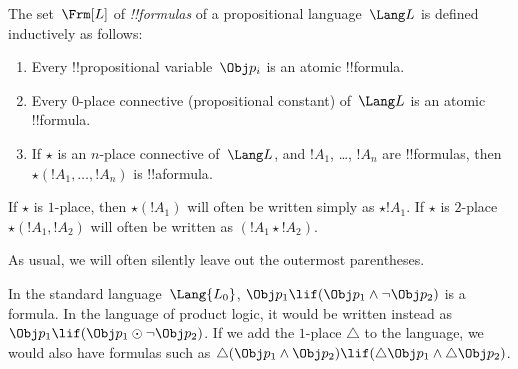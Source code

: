 \documentclass[../../../include/open-logic-section]{subfiles}
\begin{document}


\begin{defn}[Formula]
The set~$\Frm[L]$ of \emph{!!{formula}s} of a propositional
language~$\Lang L$ is defined inductively as follows:
\begin{enumerate}
\item Every !!{propositional variable}~$\Obj p_i$ is an atomic
  !!{formula}.
\item Every $0$-place connective (propositional constant) of~$\Lang L$
is an atomic !!{formula}.
\item If $\star$ is an $n$-place connective of~$\Lang L$, and $!A_1$,
\dots, $!A_n$ are !!{formula}s, then $\star(!A_1, \dots, !A_n)$ is
  !!a{formula}.
\end{enumerate}
If $\star$ is $1$-place, then $\star(!A_1)$ will often be written
simply as $\star !A_1$. If $\star$ is $2$-place $\star(!A_1,!A_2)$
will often be written as $(!A_1 \star !A_2)$. 
\end{defn}

As usual, we will often silently leave out the outermost parentheses.

\begin{ex}
  In the standard language~$\Lang{L_0}$, $\Obj p_1 \lif (\Obj p_1
  \land \lnot \Obj p_2)$ is a formula. In the language of product
  logic, it would be written instead as $\Obj p_1 \lif (\Obj p_1 \odot
  \lnot \Obj p_2)$.  If we add the $1$-place $\triangle$ to the
  language, we would also have formulas such as $\triangle (\Obj p_1
  \land \Obj p_2) \lif (\triangle \Obj p_1 \land \triangle \Obj p_2)$.
\end{ex}
\end{document}
